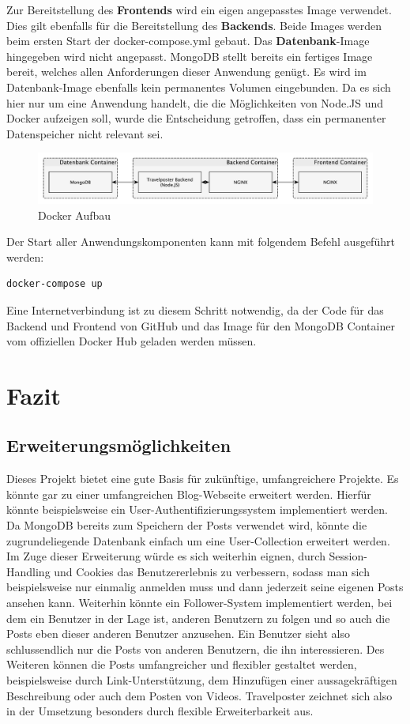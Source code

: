 \documentclass[12pt,a4paper]{report}
\begin{document}
Zur Bereitstellung des \textbf{Frontends} wird ein eigen angepasstes Image verwendet. Dies gilt ebenfalls für die Bereitstellung des \textbf{Backends}. Beide Images werden beim ersten Start der docker-compose.yml gebaut. Das \textbf{Datenbank}-Image hingegeben wird nicht angepasst. MongoDB stellt bereits ein fertiges Image bereit, welches allen Anforderungen dieser Anwendung genügt. Es wird im Datenbank-Image ebenfalls kein permanentes Volumen eingebunden. Da es sich hier nur um eine Anwendung handelt, die die Möglichkeiten von Node.JS und Docker aufzeigen soll, wurde die Entscheidung getroffen, dass ein permanenter Datenspeicher nicht relevant sei.

\begin{figure}[h]
	\centering
	\includegraphics[width=1\linewidth]{Bilder_Doku/docker}
	\caption[]{Docker Aufbau}
\end{figure}

Der Start aller Anwendungskomponenten kann mit folgendem Befehl ausgeführt werden:
\begin{verbatim}
docker-compose up
\end{verbatim}

Eine Internetverbindung ist zu diesem Schritt notwendig, da der Code für das Backend und Frontend von GitHub und das Image für den MongoDB Container vom offiziellen Docker Hub geladen werden müssen.

\newpage
\chapter{Fazit}
\section{Erweiterungsmöglichkeiten}
Dieses Projekt bietet eine gute Basis für zukünftige, umfangreichere Projekte. Es könnte gar zu einer umfangreichen Blog-Webseite erweitert werden. Hierfür könnte beispielsweise ein User-Authentifizierungssystem implementiert werden. Da MongoDB bereits zum Speichern der Posts verwendet wird, könnte die zugrundeliegende Datenbank einfach um eine User-Collection erweitert werden. Im Zuge dieser Erweiterung würde es sich weiterhin eignen, durch Session-Handling und Cookies das Benutzererlebnis zu verbessern, sodass man sich beispielsweise nur einmalig anmelden muss und dann jederzeit seine eigenen Posts ansehen kann. Weiterhin könnte ein Follower-System implementiert werden, bei dem ein Benutzer in der Lage ist, anderen Benutzern zu folgen und so auch die Posts eben dieser anderen Benutzer anzusehen. Ein Benutzer sieht also schlussendlich nur die Posts von anderen Benutzern, die ihn interessieren.
Des Weiteren können die Posts umfangreicher und flexibler gestaltet werden, beispielsweise durch Link-Unterstützung, dem Hinzufügen einer aussagekräftigen Beschreibung oder auch dem Posten von Videos. Travelposter zeichnet sich also in der Umsetzung besonders durch flexible Erweiterbarkeit aus.
\end{document}
